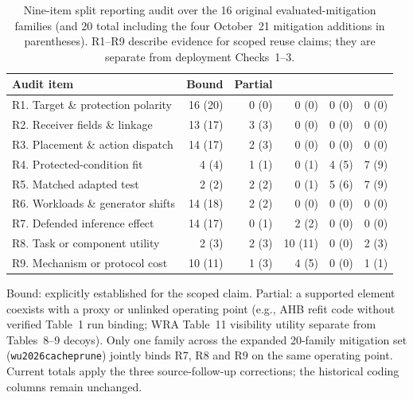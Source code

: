 \begin{table}[t]\centering\footnotesize
\caption{Nine-item split reporting audit over the 16 original evaluated-mitigation families (and 20 total including the four October~21 mitigation additions in parentheses). R1--R9 describe evidence for scoped reuse claims; they are separate from deployment Checks~1--3.}\label{tab:six-check-audit}
\setlength{\tabcolsep}{3.5pt}
\begin{tabularx}{\columnwidth}{@{}Yrrrrr@{}}\toprule
Audit item & Bound & Partial & \NRR{} & \NRV{} & \NA{}\\\midrule
R1. Target \& protection polarity & 16 (20) & 0 (0) & 0 (0) & 0 (0) & 0 (0)\\
R2. Receiver fields \& linkage & 13 (17) & 3 (3) & 0 (0) & 0 (0) & 0 (0)\\
R3. Placement \& action dispatch & 14 (17) & 2 (3) & 0 (0) & 0 (0) & 0 (0)\\
R4. Protected-condition fit & 4 (4) & 1 (1) & 0 (1) & 4 (5) & 7 (9)\\
R5. Matched adapted test & 2 (2) & 2 (2) & 0 (1) & 5 (6) & 7 (9)\\
R6. Workloads \& generator shifts & 14 (18) & 2 (2) & 0 (0) & 0 (0) & 0 (0)\\
R7. Defended inference effect & 14 (17) & 0 (1) & 2 (2) & 0 (0) & 0 (0)\\
R8. Task or component utility & 2 (3) & 2 (3) & 10 (11) & 0 (0) & 2 (3)\\
R9. Mechanism or protocol cost & 10 (11) & 1 (3) & 4 (5) & 0 (0) & 1 (1)\\\bottomrule
\end{tabularx}
\par\smallskip\raggedright\footnotesize
Bound: explicitly established for the scoped claim. Partial: a supported element coexists with a proxy or unlinked operating point (e.g., AHB refit code without verified Table~1 run binding; WRA Table~11 visibility utility separate from Tables~8--9 decoys). Only one family across the expanded 20-family mitigation set (\texttt{wu2026cacheprune}) jointly binds R7, R8 and R9 on the same operating point. Current totals apply the three source-follow-up corrections; the historical coding columns remain unchanged.
\end{table}

